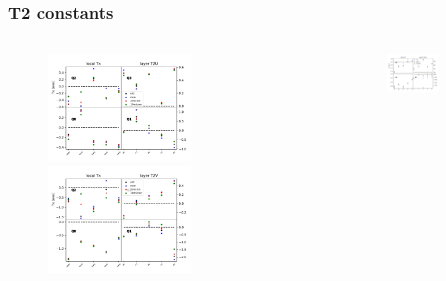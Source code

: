 \documentclass[aspectratio=1610, 12pt]{beamer}
\begin{document}
\begin{frame}
\begin{columns}
\begin{column}[c]{0.5\textwidth}
\begin{figure}
      \end{figure}
    \end{column}
  \end{columns}
\end{frame}

\begin{frame}\frametitle{T2 constants}
  \begin{columns}
    \begin{column}[c]{0.5\textwidth}
      \begin{figure}
        \includegraphics[width=0.6\textwidth]{plots/compi/Tx/blue_red_comp_T2U_Tx.pdf}
        \includegraphics[width=0.6\textwidth]{plots/compi/Tx/blue_red_comp_T2V_Tx.pdf}
      \end{figure}
    \end{column}
    \begin{column}[c]{0.5\textwidth}
      \begin{figure}
        \includegraphics[width=0.6\textwidth]{plots/compi/Tx/blue_red_comp_T2X1_Tx.pdf}

\end{figure}
\end{column}
\end{columns}
\end{frame}
\end{document}
